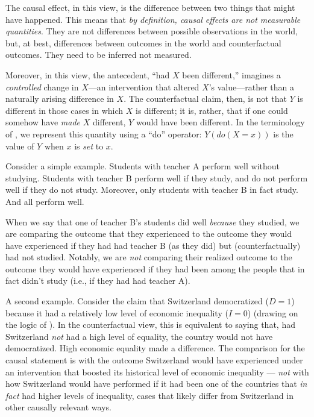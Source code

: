 \documentclass[
  12pt,
]{book}
\begin{document}
The causal effect, in this view, is the difference between two things that might have happened. This means that \emph{by definition, causal effects are not measurable quantities}. They are not differences between possible observations in the world, but, at best, differences between outcomes in the world and counterfactual outcomes. They need to be inferred not measured.

Moreover, in this view, the antecedent, ``had \(X\) been different,'' imagines a \emph{controlled} change in \(X\)---an intervention that altered \(X\)'s value---rather than a naturally arising difference in \(X\). The counterfactual claim, then, is not that \(Y\) is different in those cases in which \(X\) is different; it is, rather, that if one could somehow have \emph{made} \(X\) different, \(Y\) would have been different. In the terminology of \citet{pearl2000causality}, we represent this quantity using a ``do'' operator: \(Y(do(X=x))\) is the value of \(Y\) when \(x\) is \emph{set} to \(x\).

Consider a simple example. Students with teacher A perform well without studying. Students with teacher B perform well if they study, and do not perform well if they do not study. Moreover, only students with teacher B in fact study. And all perform well.

When we say that one of teacher B's students did well \emph{because} they studied, we are comparing the outcome that they experienced to the outcome they would have experienced if they had had teacher B (as they did) but (counterfactually) had not studied. Notably, we are \emph{not} comparing their realized outcome to the outcome they would have experienced if they had been among the people that in fact didn't study (i.e., if they had had teacher A).

A second example. Consider the claim that Switzerland democratized (\(D=1\)) because it had a relatively low level of economic inequality (\(I=0\)) (drawing on the logic of \citet{boix2003democracy}). In the counterfactual view, this is equivalent to saying that, had Switzerland \emph{not} had a high level of equality, the country would not have democratized. High economic equality made a difference. The comparison for the causal statement is with the outcome Switzerland would have experienced under an intervention that boosted its historical level of economic inequality --- \emph{not} with how Switzerland would have performed if it had been one of the countries that \emph{in fact} had higher levels of inequality, cases that likely differ from Switzerland in other causally relevant ways.
\end{document}
